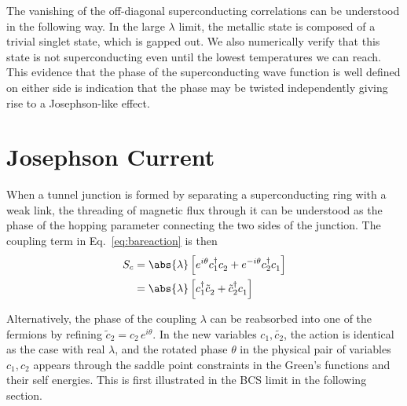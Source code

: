 The vanishing of the off-diagonal superconducting correlations can be understood in the following way. In the large $\lambda$ limit, the metallic state is composed of a trivial singlet state, which is gapped out. We also numerically verify that this state is not superconducting even until the lowest temperatures we can reach. 
%
This evidence that the phase of the superconducting wave function is well defined on either side is indication that the phase may be twisted independently giving rise to a Josephson-like effect. 

\section{Josephson Current}
When a tunnel junction is formed by separating a superconducting ring with a weak link, the threading of magnetic flux through it can be understood as the phase of the hopping parameter connecting the two sides of the junction. The coupling term in Eq.~\eqref{eq:bareaction} is then
\begin{align}
    S_c &= \abs{\lambda}\left[e^{i\theta} c_1^\dagger c_2^{\phantom{\dagger}} + e^{-i\theta} c_2^\dagger c_1^{\phantom{\dagger}}\right] \nonumber \\
    &= \abs{\lambda}\left[c_1^\dagger \tilde{c}_2^{\phantom{\dagger}} +  \tilde{c}_2^\dagger c_1^{\phantom{\dagger}}\right] 
    \label{eq:transphasetocops}
\end{align}

Alternatively, the phase of the coupling $\lambda$ can be reabsorbed into one of the fermions by refining $\tilde{c}_2 = c_2 \,e^{i\theta}$. In the new variables $c_1, \tilde{c_2}$, the action is identical as the case with real $\lambda$, and the rotated phase $\theta$ in the physical pair of variables $c_1, c_2$ appears through the saddle point constraints in the Green's functions and their self energies.
This is first illustrated in the BCS limit in the following section. 
